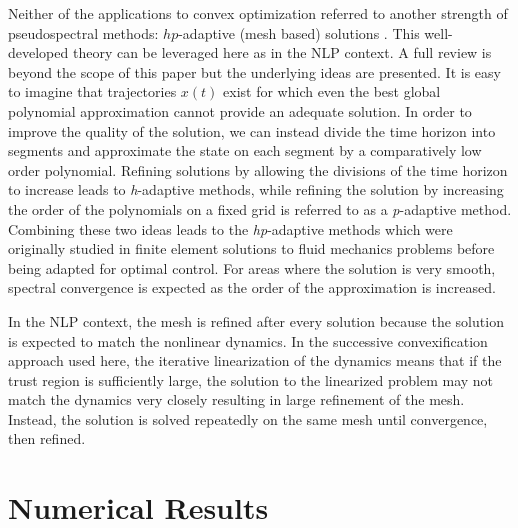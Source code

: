 \documentclass[10pt,a4paper]{article}
\begin{document}
	Neither of the applications \cite{PS_Convex,PS_Convex_ascent} to convex optimization referred to another strength of pseudospectral methods: $ hp $-adaptive (mesh based) solutions \cite{GPOPS,hp_adapt}. This well-developed theory can be leveraged here as in the NLP context. A full review is beyond the scope of this paper but the underlying ideas are presented. It is easy to imagine that trajectories $x(t)$ exist for which even the best global polynomial approximation cannot provide an adequate solution. In order to improve the quality of the solution, we can instead divide the time horizon into segments and approximate the state on each segment by a comparatively low order polynomial. Refining solutions by allowing the divisions of the time horizon to increase leads to \textit{h}-adaptive methods, while refining the solution by increasing the order of the polynomials on a fixed grid is referred to as a \textit{p}-adaptive method. Combining these two ideas leads to the \textit{hp}-adaptive methods which were originally studied in finite element solutions to fluid mechanics problems \cite{HPAdapt_origin} before being adapted for optimal control. For areas where the solution is very smooth, spectral convergence is expected as the order of the approximation is increased.
	
	In the NLP context, the mesh is refined after every solution because the solution is expected to match the nonlinear dynamics. In the successive convexification approach used here, the iterative linearization of the dynamics means that if the trust region is sufficiently large, the solution to the linearized problem may not match the dynamics very closely resulting in large refinement of the mesh. Instead, the solution is solved repeatedly on the same mesh until convergence, then refined.
	
	
	\section{Numerical Results}

	
\end{document}
